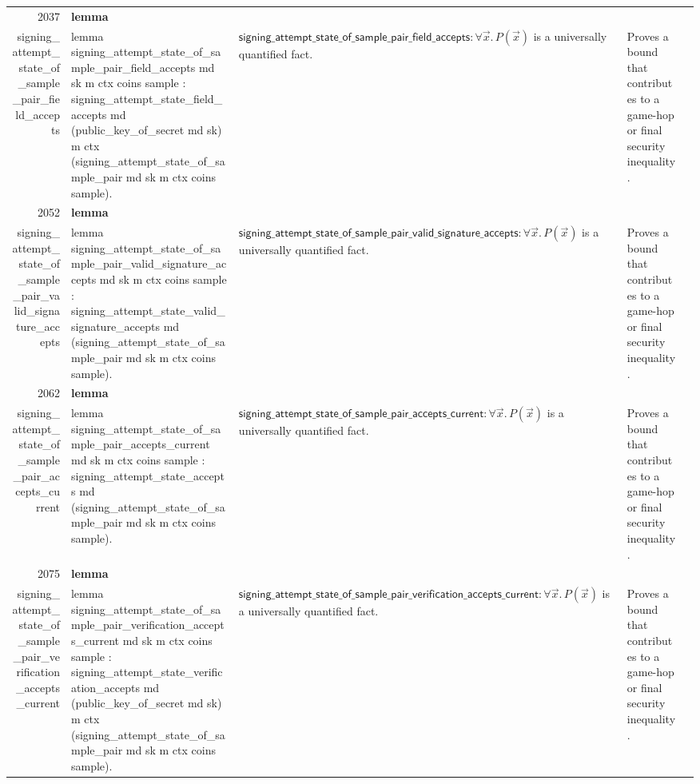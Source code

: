 \documentclass[10pt]{article}
\newcommand{\ec}[1]{\begingroup\ttfamily\scriptsize #1\endgroup}
\begin{document}
\begin{longtable}{r L{0.17\textwidth} L{0.26\textwidth} L{0.27\textwidth} L{0.20\textwidth}}
2037 & \textbf{lemma}\\\ec{signing\_attempt\_state\_of\_sample\_pair\_field\_accepts} & \ec{lemma signing\_attempt\_state\_of\_sample\_pair\_field\_accepts md sk m ctx coins sample : signing\_attempt\_state\_field\_accepts md (public\_key\_of\_secret md sk) m ctx (signing\_attempt\_state\_of\_sample\_pair md sk m ctx coins sample).} & \(\mathsf{signing\_attempt\_state\_of\_sample\_pair\_field\_accepts} : \forall \vec{x}.\, P(\vec{x})\) is a universally quantified fact. & Proves a bound that contributes to a game-hop or final security inequality. \\
2052 & \textbf{lemma}\\\ec{signing\_attempt\_state\_of\_sample\_pair\_valid\_signature\_accepts} & \ec{lemma signing\_attempt\_state\_of\_sample\_pair\_valid\_signature\_accepts md sk m ctx coins sample : signing\_attempt\_state\_valid\_signature\_accepts md (signing\_attempt\_state\_of\_sample\_pair md sk m ctx coins sample).} & \(\mathsf{signing\_attempt\_state\_of\_sample\_pair\_valid\_signature\_accepts} : \forall \vec{x}.\, P(\vec{x})\) is a universally quantified fact. & Proves a bound that contributes to a game-hop or final security inequality. \\
2062 & \textbf{lemma}\\\ec{signing\_attempt\_state\_of\_sample\_pair\_accepts\_current} & \ec{lemma signing\_attempt\_state\_of\_sample\_pair\_accepts\_current md sk m ctx coins sample : signing\_attempt\_state\_accepts md (signing\_attempt\_state\_of\_sample\_pair md sk m ctx coins sample).} & \(\mathsf{signing\_attempt\_state\_of\_sample\_pair\_accepts\_current} : \forall \vec{x}.\, P(\vec{x})\) is a universally quantified fact. & Proves a bound that contributes to a game-hop or final security inequality. \\
2075 & \textbf{lemma}\\\ec{signing\_attempt\_state\_of\_sample\_pair\_verification\_accepts\_current} & \ec{lemma signing\_attempt\_state\_of\_sample\_pair\_verification\_accepts\_current md sk m ctx coins sample : signing\_attempt\_state\_verification\_accepts md (public\_key\_of\_secret md sk) m ctx (signing\_attempt\_state\_of\_sample\_pair md sk m ctx coins sample).} & \(\mathsf{signing\_attempt\_state\_of\_sample\_pair\_verification\_accepts\_current} : \forall \vec{x}.\, P(\vec{x})\) is a universally quantified fact. & Proves a bound that contributes to a game-hop or final security inequality. \\

\end{longtable}
\end{document}
